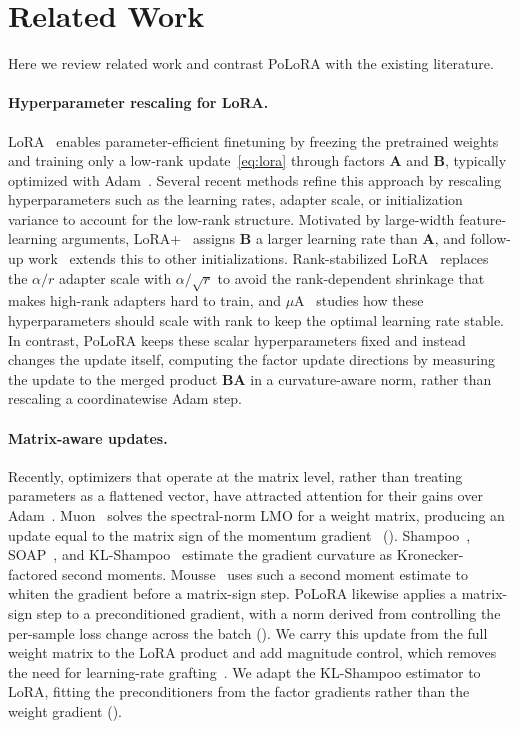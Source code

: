 \documentclass[11pt]{article}
\newcommand{\mat}[1]{\bm{#1}}
\newcommand{\methodname}{PoLoRA\xspace}
\begin{document}
\section{Related Work}
\label{sec:related}

Here we review related work and contrast \methodname{} with the existing literature.


\paragraph{Hyperparameter rescaling for LoRA.}
LoRA~\cite{lora} enables parameter-efficient finetuning by freezing the pretrained
weights and training only a low-rank update~\eqref{eq:lora} through factors $\mat{A}$ and
$\mat{B}$, typically optimized with Adam~\cite{adam}. Several recent methods refine this
approach by rescaling hyperparameters such as the learning rates, adapter scale, or
initialization variance to account for the low-rank structure. Motivated by large-width
feature-learning arguments, LoRA+~\cite{loraplus} assigns $\mat{B}$ a larger learning rate
than $\mat{A}$, and follow-up work~\cite{hayou2024initialization, li2025beyond} extends this
to other initializations. Rank-stabilized LoRA~\cite{rslora} replaces the $\alpha/r$
adapter scale with $\alpha/\sqrt{r}$ to avoid the rank-dependent shrinkage that makes
high-rank adapters hard to train, and $\mu$A~\cite{mua} studies how these
hyperparameters should scale with rank to keep the optimal learning rate stable. In
contrast, \methodname{} keeps these scalar hyperparameters fixed and instead changes the update itself, computing the factor update directions by measuring the update to the merged product $\mat{B}\mat{A}$ in a curvature-aware norm, rather than rescaling a coordinatewise Adam step.

\paragraph{Matrix-aware updates.}
Recently, optimizers that operate at the matrix level, rather than treating parameters as
a flattened vector, have attracted attention for their gains over Adam~\cite{liu2025muon,
qiu2026hyperparameter, benchmark_practices}. Muon~\cite{muon} solves the spectral-norm LMO
for a weight matrix, producing an update equal to the matrix sign of the momentum
gradient~\cite{polarexpress} (). Shampoo~\cite{shampoo},
SOAP~\cite{soap}, and KL-Shampoo~\cite{klshampoo} estimate the gradient curvature as
Kronecker-factored second moments. Mousse~\cite{mousse} uses such a second moment estimate to
whiten the gradient before a matrix-sign step. \methodname{} likewise applies a matrix-sign step to a preconditioned gradient, with a norm derived from controlling the per-sample loss change across the batch (). We carry this update from the full weight matrix to the LoRA product and add magnitude control, which removes the need for learning-rate grafting~\cite{shi2023distributed, mousse}. We adapt the KL-Shampoo estimator to LoRA, fitting the preconditioners from the factor gradients rather than the weight gradient ().
\end{document}
